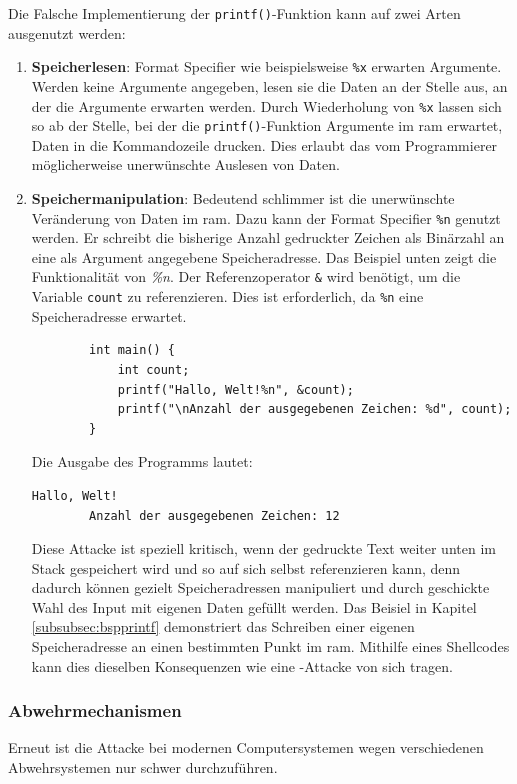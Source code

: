 \documentclass[11pt, a4paper]{article}
\begin{document}
Die Falsche Implementierung der \texttt{printf()}-Funktion kann auf zwei Arten ausgenutzt werden:
\begin{enumerate}
	\item \textbf{Speicherlesen}: Format Specifier wie beispielsweise \texttt{\%x} erwarten Argumente. Werden keine Argumente angegeben, lesen sie die Daten an der Stelle aus, an der die Argumente erwarten werden. Durch Wiederholung von \texttt{\%x} lassen sich so ab der Stelle, bei der die \texttt{printf()}-Funktion Argumente im \gls{ram} erwartet, Daten in die Kommandozeile drucken. Dies erlaubt das vom Programmierer möglicherweise unerwünschte Auslesen von Daten.
	\item \textbf{Speichermanipulation}: Bedeutend schlimmer ist die unerwünschte Veränderung von Daten im \gls{ram}. Dazu kann der Format Specifier \texttt{\%n} genutzt werden. Er schreibt die bisherige Anzahl gedruckter Zeichen als Binärzahl an eine als Argument angegebene Speicheradresse. Das Beispiel unten zeigt die Funktionalität von \textit{\%n}. Der Referenzoperator \texttt{\&} wird benötigt, um die Variable \texttt{count} zu referenzieren. Dies ist erforderlich, da \texttt{\%n} eine Speicheradresse erwartet.
	\begin{lstlisting}
		int main() {
			int count;
			printf("Hallo, Welt!%n", &count);
			printf("\nAnzahl der ausgegebenen Zeichen: %d", count); 
		}
	\end{lstlisting}
	Die Ausgabe des Programms lautet:
	\begin{lstlisting}[style=COutputStyle]
		Hallo, Welt!
		Anzahl der ausgegebenen Zeichen: 12
	\end{lstlisting}
	Diese Attacke ist speziell kritisch, wenn der gedruckte Text weiter unten im Stack gespeichert wird und so auf sich selbst referenzieren kann, denn dadurch können gezielt Speicheradressen manipuliert und durch geschickte Wahl des Input mit eigenen Daten gefüllt werden. Das Beisiel in Kapitel \ref{subsubsec:bspprintf} demonstriert das Schreiben einer eigenen Speicheradresse an einen bestimmten Punkt im \gls{ram}. Mithilfe eines Shellcodes kann dies dieselben Konsequenzen wie eine -Attacke von sich tragen.
\end{enumerate}

\subsubsection{Abwehrmechanismen}
Erneut ist die Attacke bei modernen Computersystemen wegen verschiedenen Abwehrsystemen nur schwer durchzuführen.
\end{document}
